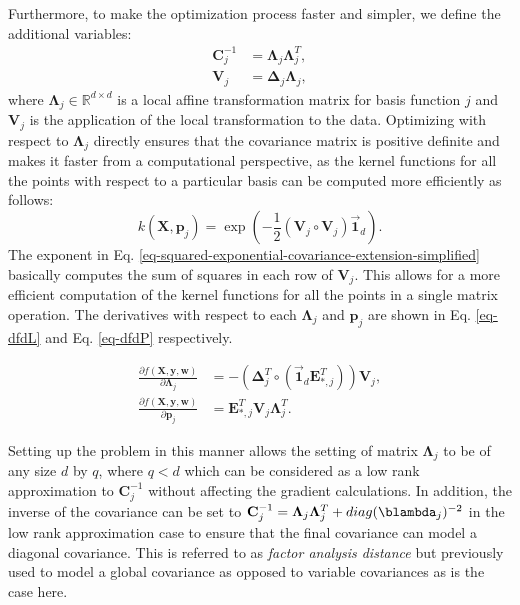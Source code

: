 \documentclass[useAMS,usenatbib,fleqn]{mn2e}
\begin{document}
Furthermore, to make the optimization process faster and simpler, we define the additional variables:
\begin{subequations}
\begin{align}
\label{eq-Cinv}
\mathbf{C}_{j}^{-1} &= \mathbf\Lambda_{j}\mathbf\Lambda_{j}^{T},\\
\label{eq-V_j}
\mathbf{V}_{j} &= \mathbf\Delta_{j}\mathbf\Lambda_{j},
\end{align}
\end{subequations}
where $\mathbf\Lambda_{j} \in \mathbb{R}^{d\times d}$ is a local affine transformation matrix for basis function $j$ and $\mathbf{V}_{j}$ is the application of the local transformation to the data. Optimizing with respect to $\mathbf\Lambda_{j}$ directly ensures that the covariance matrix is positive definite and makes it faster from a computational perspective, as the kernel functions for all the points with respect to a particular basis can be computed more efficiently as follows:
\begin{equation}
\label{eq-squared-exponential-covariance-extension-simplified}
k(\mathbf{X},\mathbf{p}_{j}) = \exp{\left(-\frac{1}{2}\left(\mathbf{V}_{j}\circ \mathbf{V}_{j}\right)\vec{\mathbf{1}}_{d}\right)}.
\end{equation}
The exponent in Eq. \eqref{eq-squared-exponential-covariance-extension-simplified} basically computes the sum of squares in each row of $\mathbf{V}_{j}$. This allows for a more efficient computation of the kernel functions for all the points in a single matrix operation. The derivatives with respect to each $\mathbf\Lambda_{j}$ and $\mathbf{p}_{j}$ are shown in Eq. \eqref{eq-dfdL} and Eq. \eqref{eq-dfdP} respectively.

\begin{subequations}
\begin{align}
\label{eq-dfdL}
\frac{\partial f(\mathbf{X},\mathbf{y},\mathbf{w})}{\partial \mathbf\Lambda_{j}} &= -\left( \mathbf\Delta_{j}^{T}\circ \left(\vec{\mathbf{1}}_{d}\mathbf{E}_{*,j}^{T}\right) \right)\mathbf{V}_{j},\\
\label{eq-dfdP}
\frac{\partial f(\mathbf{X},\mathbf{y},\mathbf{w})}{\partial \mathbf{p}_{j}} &= \mathbf{E}_{*,j}^{T}\mathbf{V}_{j}\mathbf\Lambda_{j}^{T}.
\end{align}
\end{subequations}


Setting up the problem in this manner allows the setting of matrix $\mathbf\Lambda_{j}$ to be of any size $d$ by $q$, where $q<d$ which can be considered as a low rank approximation to $\mathbf{C}_{j}^{-1}$ without affecting the gradient calculations. In addition, the inverse of the covariance can be set to  $\mathbf{C}_{j}^{-1}=\mathbf\Lambda_{j}\mathbf\Lambda_{j}^{T}+diag(\blambda_{j})^{-2}$ in the low rank approximation case to ensure that the final covariance can model a diagonal covariance. This is referred to as \emph{factor analysis distance} \citep[p. 107]{rasmussen2006gaussian} but previously used to model a global covariance as opposed to variable covariances as is the case here.
\end{document}
